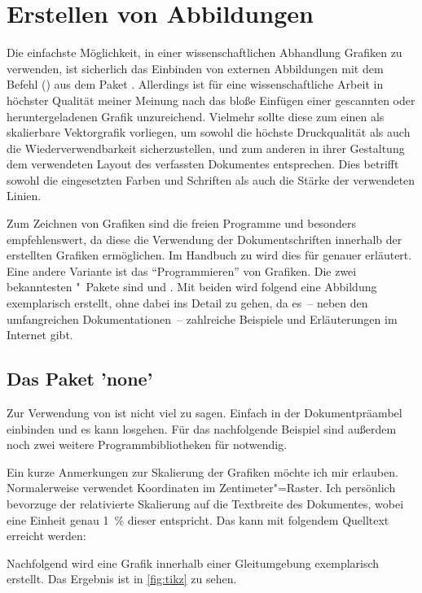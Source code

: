 \documentclass[%
  english,ngerman,%
  cdgeometry=no,DIV=12,%
  automark,%
  listof=toc,%
]{tudscrartcl}
\begin{document}
\section{Erstellen von Abbildungen}
\label{sec:figures}%
%
Die einfachste Möglichkeit, in einer wissenschaftlichen Abhandlung Grafiken zu 
verwenden, ist sicherlich das Einbinden von externen Abbildungen mit dem Befehl 
() aus dem Paket . 
Allerdings ist für eine wissenschaftliche Arbeit in höchster Qualität meiner 
Meinung nach das bloße Einfügen einer gescannten oder heruntergeladenen Grafik 
unzureichend. Vielmehr sollte diese zum einen als skalierbare Vektorgrafik 
vorliegen, um sowohl die höchste Druckqualität als auch die 
Wiederverwendbarkeit sicherzustellen, und zum anderen in ihrer Gestaltung dem 
verwendeten Layout des verfassten Dokumentes entsprechen. Dies betrifft sowohl 
die eingesetzten Farben und Schriften als auch die Stärke der verwendeten 
Linien.

Zum Zeichnen von Grafiken sind die freien Programme  und 
besonders  empfehlenswert, da diese die Verwendung der 
Dokumentschriften innerhalb der erstellten Grafiken ermöglichen. Im Handbuch zu 
\TUDScript wird dies für  
genauer erläutert. Eine andere Variante ist das \enquote{Programmieren} von 
Grafiken. Die zwei bekanntesten "~Pakete sind 
und . Mit beiden wird folgend eine Abbildung exemplarisch 
erstellt, ohne dabei ins Detail zu gehen, da es~-- neben den umfangreichen 
Dokumentationen~-- zahlreiche Beispiele und Erläuterungen im Internet gibt.


\subsection{Das Paket 'none'}
Zur Verwendung von  ist nicht viel zu sagen. Einfach in der 
Dokumentpräambel einbinden und es kann losgehen. Für das nachfolgende Beispiel 
sind außerdem noch zwei weitere Programmbibliotheken für  
notwendig.
%
\begin{Hint}
\usepackage{tikz}
\usetikzlibrary{chains}
\usetikzlibrary{decorations.markings}
\tikzset{on grid}
\end{Hint}
%
Ein kurze Anmerkungen zur Skalierung der Grafiken möchte ich mir erlauben. 
Normalerweise verwendet  Koordinaten im Zentimeter"=Raster. Ich 
persönlich bevorzuge der relativierte Skalierung auf die Textbreite des 
Dokumentes, wobei eine Einheit genau \SI{1}{\percent} dieser entspricht. Das 
kann mit folgendem Quelltext erreicht werden:
%
\CodeHook{\renewcommand\newlength[1]{}}
\begin{Hint*}
\newlength{\tikzunit}
\setlength{\tikzunit}{.01\textwidth}
\tikzset{x=\tikzunit,y=\tikzunit}
\end{Hint*}
%
Nachfolgend wird eine Grafik innerhalb einer Gleitumgebung exemplarisch 
erstellt. Das Ergebnis ist in \autoref{fig:tikz} zu sehen.
\end{document}

